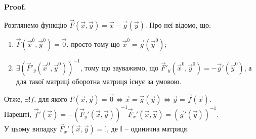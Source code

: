 \documentclass[a4paper, 10pt]{article}
\makeatletter
\theoremstyle{theoremdd}
\theoremstyle{theoremdd}
\theoremstyle{theoremdd}
\theoremstyle{theoremdd}
\theoremstyle{theoremdd}
\theoremstyle{theoremdd}
\theoremstyle{theoremdd}
\theoremstyle{theoremdd}
\theoremstyle{theoremdd}
\renewenvironment{proof}[1][Proof.\\]{\par
\pushQED{\hfill \qed}%
\normalfont \topsep6\p@\@plus6\p@\relax
\trivlist
\item\relax
{\bfseries
#1\@addpunct{.}}\hspace\labelsep\ignorespaces
}{%
\popQED\endtrivlist\@endpefalse
}
\makeatother
\begin{document}
\begin{proof}
Розглянемо функцію $\vec{F}(\vec{x},\vec{y}) = \vec{x} - \vec{g}(\vec{y})$. Про неї відомо, що:
\begin{enumerate}[nosep,wide=0pt,label={\arabic*)}]
\item $\vec{F}(\vec{x}^0,\vec{y}^0) = \vec{0}$, просто тому що $\vec{x}^0 = \vec{g}(\vec{y}^0)$;
\item $\exists (\vec{F}'_y(\vec{x}^0,\vec{y}^0))^{-1}$, тому що зауважимо, що $\vec{F}'_y(\vec{x}^0,\vec{y}^0) = -\vec{g}'(\vec{y}^0)$, а для такої матриці оборотна матриця існує за умовою.
\end{enumerate}
Отже, $\exists! f$, для якого $F(\vec{x},\vec{y}) = \vec{0} \iff \vec{x} = \vec{g}(\vec{y}) \iff \vec{y} = \vec{f}(\vec{x})$.\\
Нарешті, $\vec{f}'(\vec{x}) = -(\vec{F}_y'(\vec{x},\vec{y}))^{-1} \vec{F}_x'(\vec{x},\vec{y}) = (\vec{g}'(\vec{y}))^{-1}$.\\
У цьому випадку $\vec{F}_x'(\vec{x},\vec{y}) = \mathbb{I}$, де $\mathbb{I}$ -- одинична матриця.
\end{proof}
\end{document}
